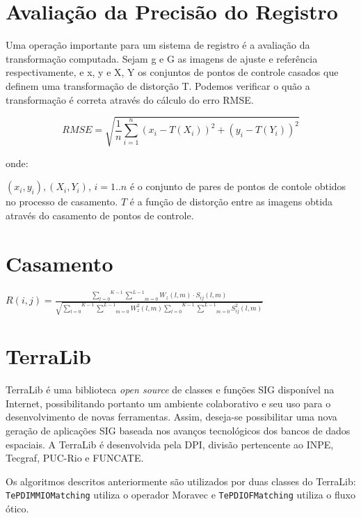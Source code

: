 \documentclass[9pt, a4paper, nofonttune, journal]{IEEEtran}
\begin{document}
\section{Avaliação da Precisão do Registro}
Uma operação importante para um sistema de registro é a avaliação da transformação computada. Sejam {g} e {G} as imagens de ajuste e referência respectivamente, e {x, y} e {X, Y} os conjuntos de pontos de controle casados que definem uma transformação de distorção {T}. Podemos verificar o quão a transformação é correta através do cálculo do erro RMSE.

$$
	RMSE = \sqrt{\frac{1}{n}\sum\limits_{i=1}^{n}(x_i - T(X_i))^2 + (y_i - T(Y_i))^2}
$$

onde:

$(x_i, y_i), (X_i, Y_i)$, $i = 1..n$ é o conjunto de pares de pontos de contole obtidos no processo de casamento.
$T$ é a função de distorção entre as imagens obtida através do casamento de pontos de controle.

\section{Casamento}

\cite{Leila1}\cite{Zhao1}
\begin{center}
$R(i,j)=\frac{\overset{K-1}{\underset{l=0}{\sum}}\underset{m=0}{\overset{L-1}{\sum}}W_{z}(l,m)\cdot S_{ij}(l,m)}{\sqrt{\overset{K-1}{\underset{l=0}{\sum}}\underset{m=0}{\overset{L-1}{\sum}}W_{z}^{2}(l,m)\overset{K-1}{\underset{l=0}{\sum}}\underset{m=0}{\overset{L-1}{\sum}}S_{ij}^{2}(l,m)}}$\end{center}

\section{TerraLib}
TerraLib é uma biblioteca \textit{open source} de classes e funções SIG disponível na Internet, possibilitando portanto um ambiente colaborativo e seu uso
para o desenvolvimento de novas ferramentas. Assim, deseja-se possibilitar uma nova geração de aplicações SIG baseada nos avanços tecnológicos dos bancos de dados espaciais.
A TerraLib é desenvolvida pela DPI, divisão pertencente ao INPE, Tecgraf, PUC-Rio e FUNCATE.\cite{Terralib1}

Os algoritmos descritos anteriormente são utilizados por duas classes do TerraLib: \texttt{TePDIMMIOMatching} utiliza o operador Moravec e \texttt{TePDIOFMatching} utiliza o fluxo ótico.
\end{document}
